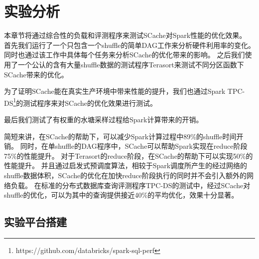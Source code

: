 
\chapter{实验分析}
\label{chap:evaluation}

本章节将通过综合性的负载和评测程序来测试SCache对Spark性能的优化效果。
首先我们运行了一个只包含一个shuffle的简单DAG工作来分析硬件利用率的变化。
同时也通过该工作中具体每个任务来分析SCache的优化带来的影响。
之后我们使用了一个公认的含有大量shuffle数据的测试程序Terasort\cite{terasort}来测试不同分区函数下SCache带来的优化。

为了证明SCache能在真实生产环境中带来性能的提升，我们也通过Spark TPC-DS\footnote{https://github.com/databricks/spark-sql-perf}的测试程序来对SCache的优化效果进行测试。

最后我们测试了有权重的水塘采样过程给Spark计算带来的开销。

简短来讲，在SCache的帮助下，可以减少Spark计算过程中89\%的shuffle时间开销。
同时，在单shuffle的DAG程序中，SCache可以帮助Spark实现在reduce阶段75\%的性能提升。
对于Terasort的reduce阶段，在SCache的帮助下可以实现50\%的性能提升。
并且通过启发式预调度算法，相较于Spark调度所产生的经过网络的shuffle数据体积，SCache的优化在加快reduce阶段执行的同时并不会引入额外的网络负载。
在标准的分布式数据库查询评测程序TPC-DS的测试中，经过SCache对shuffle的优化，可以为其中的查询提供接近40\%的平均优化，效果十分显著。

\section{实验平台搭建}

